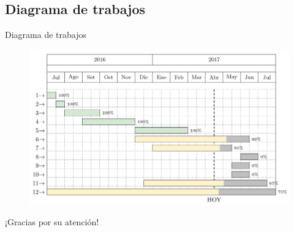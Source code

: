 \documentclass[10pt,xcolor=table ]{beamer}
\begin{document}
\subsection{Diagrama de trabajos}
\begin{frame}{Diagrama de trabajos}
	\begin{figure}
		\centering
	    \includegraphics[scale=0.3]{../Figuras/proceso/gantt}
	\end{figure}
\end{frame}

\begin{frame}[standout]
  ¡Gracias por su atención!
\end{frame}
\end{document}
